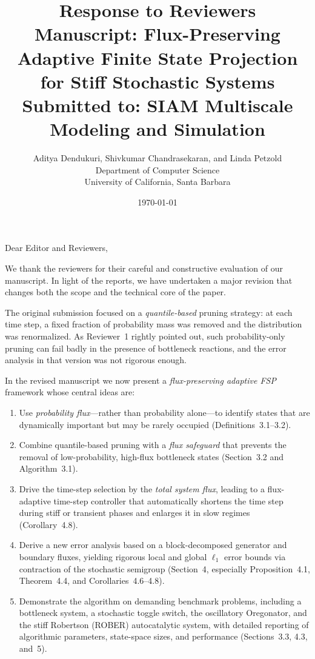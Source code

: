 \documentclass[11pt]{article}
\title{\textbf{Response to Reviewers}\\[0.5em]
\large Manuscript: Flux-Preserving Adaptive Finite State Projection\\
for Stiff Stochastic Systems\\[0.5em]
\normalsize Submitted to: SIAM Multiscale Modeling and Simulation}
\author{Aditya Dendukuri, Shivkumar Chandrasekaran, and Linda Petzold\\
Department of Computer Science\\
University of California, Santa Barbara}
\date{\today}
\begin{document}
\maketitle

\noindent Dear Editor and Reviewers,

We thank the reviewers for their careful and constructive evaluation of our manuscript.
In light of the reports, we have undertaken a major revision that changes both the
scope and the technical core of the paper.

The original submission focused on a \emph{quantile-based} pruning strategy: at each
time step, a fixed fraction of probability mass was removed and the distribution was
renormalized. As Reviewer~1 rightly pointed out, such probability-only pruning can
fail badly in the presence of bottleneck reactions, and the error analysis in that
version was not rigorous enough.

In the revised manuscript we now present a \emph{flux-preserving adaptive FSP}
framework whose central ideas are:

\begin{enumerate}[topsep=0pt,itemsep=2pt]
  \item Use \emph{probability flux}---rather than probability alone---to identify
        states that are dynamically important but may be rarely occupied
        (Definitions~3.1–3.2).
  \item Combine quantile-based pruning with a \emph{flux safeguard} that prevents
        the removal of low-probability, high-flux bottleneck states (Section~3.2
        and Algorithm~3.1).
  \item Drive the time-step selection by the \emph{total system flux}, leading to a
        flux-adaptive time-step controller that automatically shortens the time
        step during stiff or transient phases and enlarges it in slow regimes
        (Corollary~4.8).
  \item Derive a new error analysis based on a block-decomposed generator and
        boundary fluxes, yielding rigorous local and global $\ell_1$ error bounds
        via contraction of the stochastic semigroup (Section~4, especially
        Proposition~4.1, Theorem~4.4, and Corollaries~4.6–4.8).
  \item Demonstrate the algorithm on demanding benchmark problems, including a
        bottleneck system, a stochastic toggle switch, the oscillatory Oregonator,
        and the stiff Robertson (ROBER) autocatalytic system, with detailed
        reporting of algorithmic parameters, state-space sizes, and performance
        (Sections~3.3, 4.3, and~5).
\end{enumerate}
\end{document}
